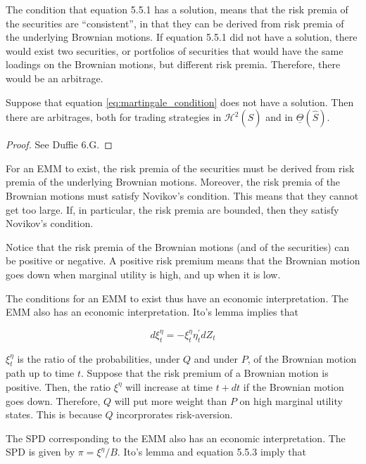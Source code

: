 \documentclass[\topdir/lecture\_notes.tex]{subfiles}
\begin{document}
The condition that equation 5.5.1 has a solution, means that the risk premia of the securities are ``consistent'', in that they can be derived from risk premia of the underlying Brownian motions. If equation 5.5.1 did not have a solution, there would exist two securities, or portfolios of securities that would have the same loadings on the Brownian motions, but different risk premia. Therefore, there would be an arbitrage.

\begin{proposition}\label{prop:arbitrage_from_inconsistent_risk_premia}
Suppose that equation \eqref{eq:martingale_condition} does not have a solution. Then there are arbitrages, both for trading strategies in $\mathcal{H}^{2}(\hat{S})$ and in $\underline{\Theta}(\hat{S})$.
\end{proposition}

\begin{proof}
See Duffie 6.G.
\end{proof}

For an EMM to exist, the risk premia of the securities must be derived from risk premia of the underlying Brownian motions. Moreover, the risk premia of the Brownian motions must satisfy Novikov's condition. This means that they cannot get too large. If, in particular, the risk premia are bounded, then they satisfy Novikov's condition.

Notice that the risk premia of the Brownian motions (and of the securities) can be positive or negative. A positive risk premium means that the Brownian motion goes down when marginal utility is high, and up when it is low.

The conditions for an EMM to exist thus have an economic interpretation. The EMM also has an economic interpretation. Ito's lemma implies that

\begin{equation*}
d \xi_{t}^{\eta}=-\xi_{t}^{\eta} \eta_{t}^{\prime} d Z_{t}
\end{equation*}

$\xi_{t}^{\eta}$ is the ratio of the probabilities, under $Q$ and under $P$, of the Brownian motion path up to time $t$. Suppose that the risk premium of a Brownian motion is positive. Then, the ratio $\xi^{\eta}$ will increase at time $t+d t$ if the Brownian motion goes down. Therefore, $Q$ will put more weight than $P$ on high marginal utility states. This is because $Q$ incorprorates risk-aversion.

The SPD corresponding to the EMM also has an economic interpretation. The SPD is given by $\pi=\xi^{\eta} / B$. Ito's lemma and equation 5.5.3 imply that
\end{document}
